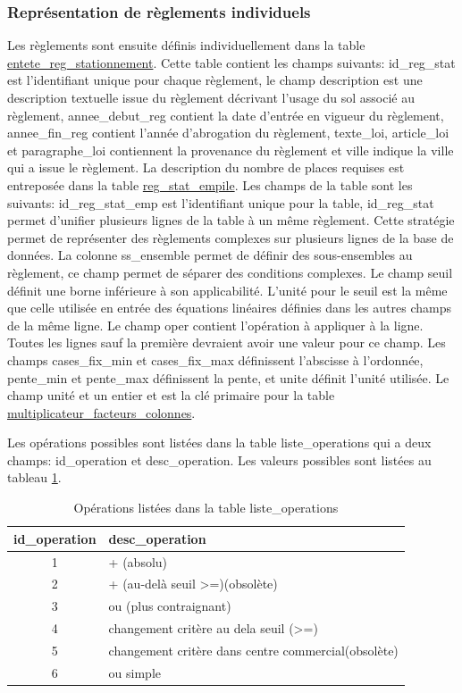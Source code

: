     \subsubsection{Représentation de règlements individuels} 
    Les règlements sont ensuite définis individuellement dans la table \underline{entete\_reg\_stationnement}. Cette table contient les champs suivants: id\_reg\_stat est l'identifiant unique pour chaque règlement, le champ description est une description textuelle issue du règlement décrivant l'usage du sol associé au règlement, annee\_debut\_reg contient la date d'entrée en vigueur du règlement, annee\_fin\_reg contient l'année d'abrogation du règlement, texte\_loi, article\_loi et paragraphe\_loi contiennent la provenance du règlement et ville indique la ville qui a issue le règlement. La description du nombre de places requises est entreposée dans la table \underline{reg\_stat\_empile}. Les champs de la table sont les suivants: id\_reg\_stat\_emp est l'identifiant unique pour la table, id\_reg\_stat permet d'unifier plusieurs lignes de la table à un même règlement. Cette stratégie permet de représenter des règlements complexes sur plusieurs lignes de la base de données. La colonne ss\_ensemble permet de définir des sous-ensembles au règlement, ce champ permet de séparer des conditions complexes.  Le champ seuil définit une borne inférieure à son applicabilité. L'unité pour le seuil est la même que celle utilisée en entrée des équations linéaires définies dans les autres champs de la même ligne. Le champ oper contient l'opération à appliquer à la ligne. Toutes les lignes sauf la première devraient avoir une valeur pour ce champ. Les champs cases\_fix\_min et cases\_fix\_max définissent l'abscisse à l'ordonnée, pente\_min et pente\_max définissent la pente, et unite définit l'unité utilisée. Le champ unité et un entier et est la clé primaire pour la table \underline{multiplicateur\_facteurs\_colonnes}. \par 
    Les opérations possibles sont listées dans la table liste\_operations qui a deux champs: id\_operation et desc\_operation. Les valeurs possibles sont listées au tableau \ref{tab:operations_table}.
    \begin{table}[h]
        \centering
        \begin{tabular}{cl}
             \hline
             id\_operation & desc\_operation  \\ \hline
             1 & + (absolu)\\
             2 & + (au-delà seuil >=)(obsolète)\\
             3 & ou (plus contraignant) \\
             4 & changement critère au dela seuil (>=)\\
             5 & changement critère dans centre commercial(obsolète)\\
             6 & ou simple \\ \hline
        \end{tabular}
        \caption{Opérations listées dans la table liste\_operations}
        \label{tab:operations_table}
    \end{table}
